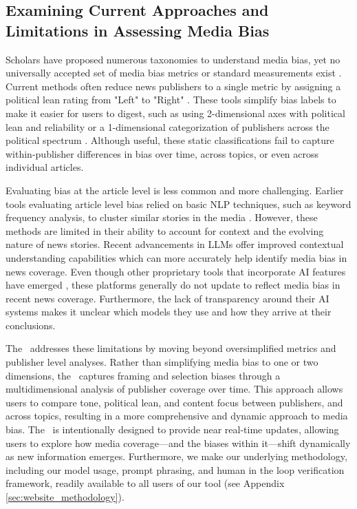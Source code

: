 \subsection{Examining Current Approaches and Limitations in Assessing Media Bias}
\label{sec:related_work_existing_tools}

Scholars have proposed numerous taxonomies to understand media bias, yet no universally accepted set of media bias metrics or standard measurements exist \cite{puglisi2015empirical, gentzkow2015media, morstatter_2018, hamborg2019automated, huang2024uncovering}. Current methods often reduce news publishers to a single metric by assigning a political lean rating from "Left" to "Right" \cite{allsides,mediabiasfactcheck,groundnews}. These tools simplify bias labels to make it easier for users to digest, such as using 2-dimensional axes with political lean and reliability \cite{adfontesmedia} or a 1-dimensional categorization of publishers across the political spectrum \cite{allsides}. Although useful, these static classifications fail to capture within-publisher differences in bias over time, across topics, or even across individual articles. 

Evaluating bias at the article level is less common and more challenging. Earlier tools evaluating article level bias relied on basic NLP techniques, such as keyword frequency analysis, to cluster similar stories in the media \cite{park2009newscube}. However, these methods are limited in their ability to account for context and the evolving nature of news stories. Recent advancements in LLMs offer improved contextual understanding capabilities which can more accurately help identify media bias in news coverage. Even though other proprietary tools that incorporate AI features have emerged \cite{biasly,allsides}, these platforms generally do not update to reflect media bias in recent news coverage. Furthermore, the lack of transparency around their AI systems makes it unclear which models they use and how they arrive at their conclusions.

The \mbd\ addresses these limitations by moving beyond oversimplified metrics and publisher level analyses. Rather than simplifying media bias to one or two dimensions, the \mbd\ captures framing and selection biases through a multidimensional analysis of publisher coverage over time. This approach allows users to compare tone, political lean, and content focus between publishers, and across topics, resulting in a more comprehensive and dynamic approach to media bias. The \mbd\ is intentionally designed to provide near real-time updates, allowing users to explore how media coverage---and the biases within it---shift dynamically as new information emerges. Furthermore, we make our underlying methodology, including our model usage, prompt phrasing, and human in the loop verification framework, readily available to all users of our tool (see Appendix \ref{sec:website_methodology}).

